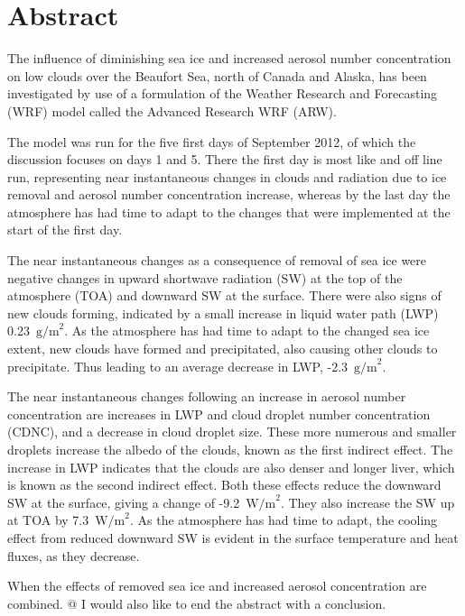 \chapter*{Abstract}
The influence of diminishing sea ice and increased aerosol number concentration on low clouds over the Beaufort Sea, north of Canada and Alaska, has been investigated by use of a formulation of the Weather Research and Forecasting (WRF) model called the Advanced Research WRF (ARW).

The model was run for the five first days of September 2012, of which the discussion focuses on days 1 and 5. There the first day is most like and off line run, representing near instantaneous changes in clouds and radiation due to ice removal and aerosol number concentration increase, whereas by the last day the atmosphere has had time to adapt to the changes that were implemented at the start of the first day.

The near instantaneous changes as a consequence of removal of sea ice were negative changes in upward shortwave radiation (SW) at the top of the atmosphere (TOA) and downward SW at the surface. There were also signs of new clouds forming, indicated by a small increase in liquid water path (LWP) 0.23~$\text{g/m}^2$. As the atmosphere has had time to adapt to the changed sea ice extent, new clouds have formed and precipitated, also causing other clouds to precipitate. Thus leading to an average decrease in LWP, -2.3~$\text{g/m}^2$.

The near instantaneous changes following an increase in aerosol number concentration are increases in LWP and cloud droplet number concentration (CDNC), and a decrease in cloud droplet size. These more numerous and smaller droplets increase the albedo of the clouds, known as the first indirect effect. The increase in LWP indicates that the clouds are also denser and longer liver, which is known as the second indirect effect. Both these effects reduce the downward SW at the surface, giving a change of -9.2~$\text{W/m}^2$. They also increase the SW up at TOA by 7.3~$\text{W/m}^2$. As the atmosphere has had time to adapt, the cooling effect from reduced downward SW is evident in the surface temperature and heat fluxes, as they decrease.

When the effects of removed sea ice and increased aerosol concentration are combined.
@ I would also like to end the abstract with a conclusion.